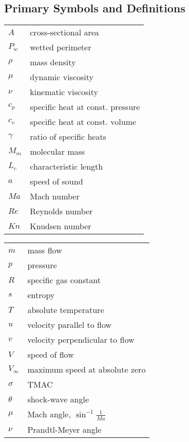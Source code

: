 \subsection*{Primary Symbols and Definitions}

\renewcommand{\arraystretch}{1.2}
\begin{multicols}{2}
\begin{flushleft}
\begin{tabular}{ll}
$A$         & cross-sectional area \\
$P_w$       & wetted perimeter \\
$\rho$      & mass density \\
$\mu$       & dynamic viscosity \\
$\nu$       & kinematic viscosity \\
$c_p$       & specific heat at const. pressure \\
$c_v$       & specific heat at const. volume \\
$\gamma$    & ratio of specific heats \\
$M_m$       & molecular mass \\
$L_c$       & characteristic length \\
$a$         & speed of sound \\
$Ma$        & Mach number \\
$Re$        & Reynolds number \\ 
$Kn$        & Knudsen number \\
\end{tabular}
\end{flushleft}
\columnbreak
\begin{flushleft}
\begin{tabular}{ll}
$\dot{m}$   & mass flow \\
$p$         & pressure \\
$R$         & specific gas constant \\
$s$         & entropy\\
$T$         & absolute temperature \\
$u$         & velocity parallel to flow \\
$v$         & velocity perpendicular to flow \\
$V$         & speed of flow \\
$V_\infty$  & maximum speed at absolute zero\\
$\sigma$    & TMAC \\
$\theta$    & shock-wave angle \\
$\mu$       & Mach angle, $\sin^{-1}\frac{1}{Ma}$ \\
$\nu$       & Prandtl-Meyer angle \\
\end{tabular}
\end{flushleft}
\end{multicols}

